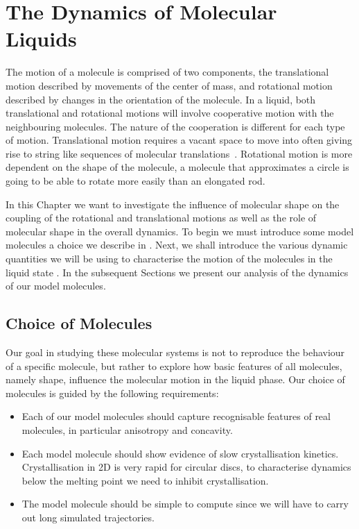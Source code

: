 \chapter{The Dynamics of Molecular Liquids}
\label{sec:dynamics}

The motion of a molecule is comprised of two components, the translational motion described by movements of the center of mass, and rotational motion described by changes in the orientation of the molecule. In a liquid, both translational and rotational motions will involve cooperative motion with the neighbouring molecules. The nature of the cooperation is different for each type of motion. Translational motion requires a vacant space to move into often giving rise to string like sequences of molecular translations~\tocite. Rotational motion is more dependent on the shape of the molecule, a molecule that approximates a circle is going to be able to rotate more easily than an elongated rod. 

In this Chapter we want to investigate the influence of molecular shape on the coupling of the rotational and translational motions as well as the role of molecular shape in the overall dynamics. To begin we must introduce some model molecules a choice we describe in . Next, we shall introduce the various dynamic quantities we will be using to characterise the motion of the molecules in the liquid state . In the subsequent Sections we present our analysis of the dynamics of our model molecules.


\section{Choice of Molecules}
\label{sec:mol choice}

Our goal in studying these molecular systems is not to reproduce the behaviour of a specific molecule, but rather to explore how basic features of all molecules, namely shape, influence the molecular motion in the liquid phase. Our choice of molecules is guided by the following requirements:
\begin{itemize}
    \item Each of our model molecules should capture recognisable features of real molecules, in particular anisotropy and concavity.
    \item Each model molecule should show evidence of slow crystallisation kinetics. Crystallisation in 2D is very rapid for circular discs, to characterise dynamics below the melting point we need to inhibit crystallisation.
    \item The model molecule should be simple to compute since we will have to carry out long simulated trajectories.
\end{itemize}

